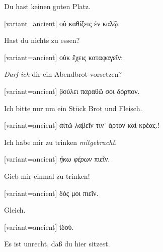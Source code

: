 Du hast keinen guten Platz.

\switchcolumn

\begin{greek}[variant=ancient]%
οὐ καθίζεις ἐν καλῷ.

\end{greek}%
\switchcolumn*

Hast du nichts zu essen?

\switchcolumn

\begin{greek}[variant=ancient]%
οὐκ ἔχεις καταφαγεῖν;

\end{greek}%
\switchcolumn*

\emph{Darf ich} dir ein Abendbrot vorsetzen?

\switchcolumn

\begin{greek}[variant=ancient]%
βούλει παραθῶ σοι δόρπον.

\end{greek}%
\switchcolumn*

Ich bitte nur um ein Stück Brot und Fleisch.

\switchcolumn

\begin{greek}[variant=ancient]%
αἰτῶ λαβεῖν τιν᾽ ἄρτον καὶ κρέας.!

\end{greek}%
\switchcolumn*

Ich habe mir zu trinken \emph{mitgebracht}.

\switchcolumn

\begin{greek}[variant=ancient]%
\emph{ἥκω φέρων} πιεῖν.

\end{greek}%
\switchcolumn*

Gieb mir einmal zu trinken!

\switchcolumn

\begin{greek}[variant=ancient]%
δός μοι πιεῖν.

\end{greek}%
\switchcolumn*

Gleich.

\switchcolumn

\begin{greek}[variant=ancient]%
ἰδού.

\end{greek}%
\switchcolumn*

Es ist unrecht, daß du hier sitzest.

